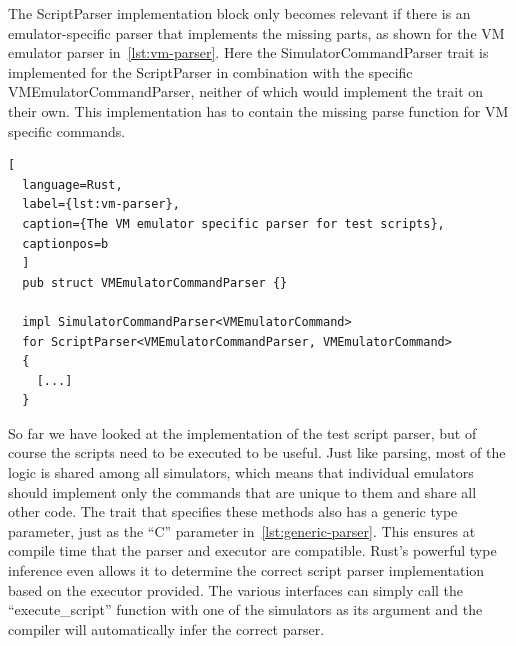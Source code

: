 The ScriptParser implementation block only becomes relevant if there is an emulator-specific parser that implements the missing parts, as shown for the VM emulator parser in~\cref{lst:vm-parser}.
Here the SimulatorCommandParser trait is implemented for the ScriptParser in combination with the specific VMEmulatorCommandParser, neither of which would implement the trait on their own.
This implementation has to contain the missing parse function for VM specific commands.

\begin{lstlisting}[
  language=Rust,
  label={lst:vm-parser},
  caption={The VM emulator specific parser for test scripts},
  captionpos=b
  ]
  pub struct VMEmulatorCommandParser {}

  impl SimulatorCommandParser<VMEmulatorCommand>
  for ScriptParser<VMEmulatorCommandParser, VMEmulatorCommand>
  {
    [...]
  }
\end{lstlisting}

So far we have looked at the implementation of the test script parser, but of course the scripts need to be executed to be useful.
Just like parsing, most of the logic is shared among all simulators, which means that individual emulators should implement only the commands that are unique to them and share all other code.
The trait that specifies these methods also has a generic type parameter, just as the ``C'' parameter in~\cref{lst:generic-parser}.
This ensures at compile time that the parser and executor are compatible.
Rust's powerful type inference even allows it to determine the correct script parser implementation based on the executor provided.
The various interfaces can simply call the ``execute\_script'' function with one of the simulators as its argument and the compiler will automatically infer the correct parser.


